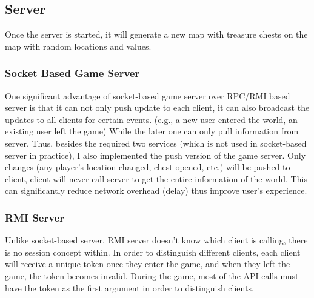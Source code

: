 \documentclass[11pt, oneside]{article}   	%
\begin{document}
\subsection{Server}
Once the server is started, it will generate a new map with treasure chests on the map with random locations and values.

\subsubsection{Socket Based Game Server}
One significant advantage of socket-based game server over RPC/RMI based server is that it can not only push update to each client, it can also broadcast the updates to all clients for certain events. (e.g., a new user entered the world, an existing user left the game)
While the later one can only pull information from server. Thus, besides the required two services (which is not used in socket-based server in practice), I also implemented the push version of the game server. Only changes (any player's location changed, chest opened, etc.) will be pushed to client, client will never call server to get the entire information of the world. This can significantly reduce network overhead (delay) thus improve user's experience.

\subsubsection{RMI Server}
Unlike socket-based server, RMI server doesn't know which client is calling, there is no session concept within. In order to distinguish different clients, each client will receive a unique token once they enter the game, and when they left the game, the token becomes invalid. During the game, most of the API calls must have the token as the first argument in order to distinguish clients.
\end{document}

